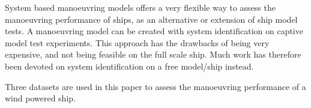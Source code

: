 System based manoeuvring models offers a very flexible way to assess the manoeuvring performance of ships, as an alternative or extension of ship model tests. A manoeuvring model can be created with system identification on captive model test experiments. This approach has the drawbacks of being very expensive, and not being feasible on the full scale ship. Much work has therefore been devoted on system identification on a free model/ship instead.


Three datasets are used in this paper to assess the manoeuvring performance of a wind powered ship.

